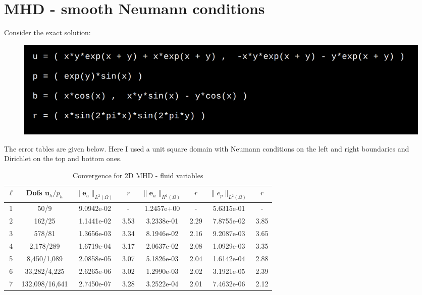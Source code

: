 \documentclass{article}
\newcommand{\uu}[1]{\boldsymbol #1}
\begin{document}
\section*{MHD - smooth Neumann conditions}

Consider the exact solution:
\begin{figure}[h!]
    \centering
    \includegraphics[width=\textwidth]{Solution}
\end{figure}


The error tables are given below. Here I used a unit square domain with Neumann conditions on the left and right boundaries and Dirichlet on the top and bottom ones.
\begin{table}[h!]
\begin{center}
\begin{tabular}{cccccccc}
\hline \hline

$\ell$ &    Dofs $\uu{u}_h/p_h$ & $\|\uu{e}_u\|_{L^2(\Omega)}$ & $r$ & $\|\uu{e}_u\|_{H^1(\Omega)}$ & $r$ &$\|e_p\|_{L^2(\Omega)}$ & $r$  \\
\hline
\hline
1 &      50/9 &  9.0942e-02 &     - &  1.2457e+00 &     - &  5.6315e-01 &      - \\
2 &     162/25 &  1.1441e-02 &     3.53 &  3.2338e-01 &     2.29 &  7.8755e-02 &      3.85 \\
3 &     578/81 &  1.3656e-03 &     3.34 &  8.1946e-02 &     2.16 &  9.2087e-03 &      3.65 \\
4 &    2,178/289 &  1.6719e-04 &     3.17 &  2.0637e-02 &     2.08 &  1.0929e-03 &      3.35 \\
5 &    8,450/1,089 &  2.0858e-05 &     3.07 &  5.1826e-03 &     2.04 &  1.6142e-04 &      2.88 \\
6 &   33,282/4,225 &  2.6265e-06 &     3.02 &  1.2990e-03 &     2.02 &  3.1921e-05 &      2.39 \\
7 &  132,098/16,641 &  2.7450e-07 &     3.28 &  3.2522e-04 &     2.01 &  7.4632e-06 &      2.12 \\
\hline\hline
\end{tabular}

\caption{Convergence for 2D MHD - fluid variables}
\label{tab:MHD_2D_smooth_fluids_velocity}
\end{center}
\end{table}
\end{document}
